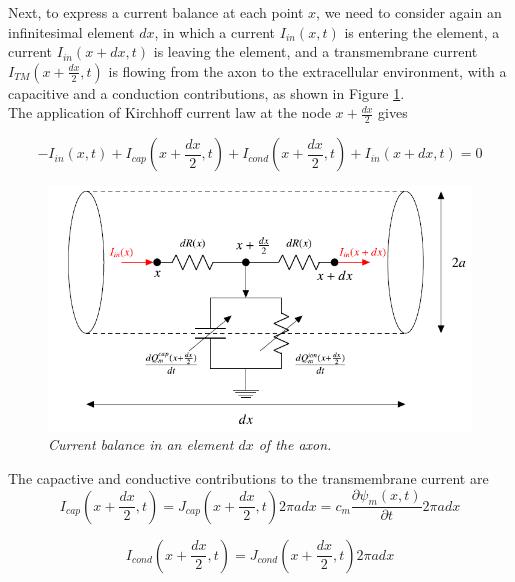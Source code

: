 \documentclass[12pt, a4paper]{report}
\begin{document}
Next, to express a current balance at each point $x$, we need to consider again an infinitesimal element $dx$, in which a current $I_{in}(x,t)$ is entering the element, a current $I_{in}(x+dx,t)$ is leaving the element, and a transmembrane current $I_{TM}(x+\frac{dx}{2},t)$ is flowing from the axon to the extracellular environment, with a capacitive and a conduction contributions, as shown in Figure \ref{curr_bal}.\\
The application of Kirchhoff current law at the node  $x+\frac{dx}{2}$ gives

\begin{equation}
- I_{in}(x,t) + I_{cap}(x+\frac{dx}{2},t) + I_{cond}(x+\frac{dx}{2},t) + I_{in}(x+dx,t) = 0 \label{kirch}
\end{equation}

\begin{figure}[H]
	\begin{center}
		
		\includegraphics[scale=0.6]{curr_bal.png} 
	\end{center} 
	\caption{\textit{Current balance in an element $dx$ of the axon.}} \label{curr_bal}
	
\end{figure}

The capactive and conductive contributions to the transmembrane current are
\begin{equation}
I_{cap}(x+\frac{dx}{2},t) = J_{cap}(x+\frac{dx}{2},t) 2 \pi a dx = c_m \frac{\partial \psi_m(x,t)}{\partial t} 2 \pi a dx 
\end{equation}

\begin{equation}
I_{cond}(x+\frac{dx}{2},t) = J_{cond}(x+\frac{dx}{2},t) 2 \pi a dx 
\end{equation}
\end{document}
